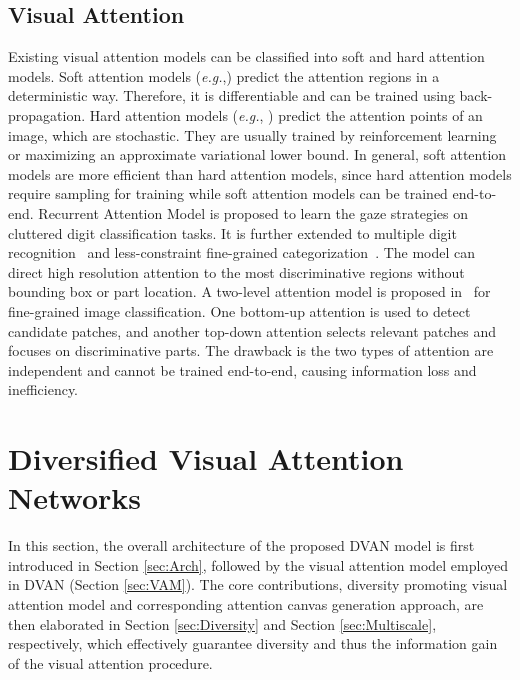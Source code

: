 \documentclass[journal]{IEEEtran}
\begin{document}
\subsection{Visual Attention}
Existing visual attention models can be classified into soft and hard attention models. Soft attention models (\textit{e.g.},\cite{action_recognition, Jaderberg:2015vo}) predict the attention regions in a deterministic way. Therefore, it is differentiable and can be trained using back-propagation. Hard attention models (\textit{e.g.}, \cite{fully_convolutional_attention, Xu:2015ut, ram, multiple-object_visual-attention, attention_categorization}) predict the attention points of an image, which are stochastic. They are usually trained by reinforcement learning \cite{reinforcement} or maximizing an approximate variational lower bound. In general, soft attention models are more efficient than hard attention models, since hard attention models require sampling for training while soft attention models can be trained end-to-end.
Recurrent Attention Model \cite{ram} is proposed to learn the gaze strategies on cluttered digit classification tasks. It is further extended to multiple digit recognition~\cite{multiple-object_visual-attention} and less-constraint fine-grained categorization~\cite{attention_categorization}. The model can direct high resolution attention to the most discriminative regions without bounding box or part location. A two-level attention model is proposed in~\cite{two_level_attention} for fine-grained image classification. One bottom-up attention is used to detect candidate patches, and another top-down attention selects relevant patches and focuses on discriminative parts. The drawback is the two types of attention are independent and cannot be trained end-to-end, causing information loss and inefficiency.

\section{Diversified Visual Attention Networks}
\label{sec:methods}
In this section, the overall architecture of the proposed DVAN model is first introduced in Section \ref{sec:Arch}, followed by the visual attention model employed in DVAN (Section \ref{sec:VAM}). The core contributions, diversity promoting visual attention model and corresponding attention canvas generation approach, are then elaborated in Section \ref{sec:Diversity} and Section \ref{sec:Multiscale}, respectively, which effectively guarantee diversity and thus the information gain of the visual attention procedure.
\end{document}
